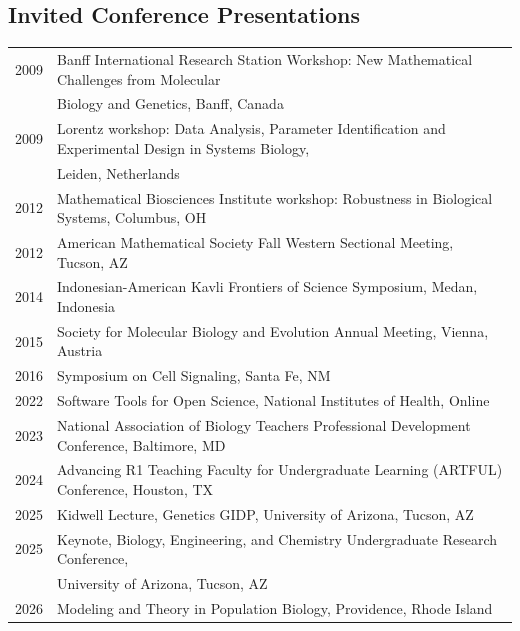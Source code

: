 \documentclass[11pt]{article}
\begin{document}
\subsection*{Invited Conference Presentations}
\begin{longtable}[l]{l l}
2009 & Banff International Research Station Workshop: New Mathematical Challenges from Molecular\\
&Biology and Genetics, Banff, Canada\\
2009 & Lorentz workshop: Data Analysis, Parameter Identification and Experimental Design in Systems Biology,\\& Leiden, Netherlands\\
2012 & Mathematical Biosciences Institute workshop: Robustness in Biological Systems, Columbus, OH\\
2012 & American Mathematical Society Fall Western Sectional Meeting, Tucson, AZ\\
2014 & Indonesian-American Kavli Frontiers of Science Symposium, Medan, Indonesia\\
2015 & Society for Molecular Biology and Evolution Annual Meeting, Vienna, Austria\\
2016 & Symposium on Cell Signaling, Santa Fe, NM\\
2022 & Software Tools for Open Science, National Institutes of Health, Online\\
2023 & National Association of Biology Teachers Professional Development Conference, Baltimore, MD\\
2024 & Advancing R1 Teaching Faculty for Undergraduate Learning (ARTFUL) Conference, Houston, TX\\
2025 & Kidwell Lecture, Genetics GIDP, University of Arizona, Tucson, AZ\\
2025 & Keynote, Biology, Engineering, and Chemistry Undergraduate Research Conference,\\
  & University of Arizona, Tucson, AZ\\
2026 & Modeling and Theory in Population Biology, Providence, Rhode Island\\
\end{longtable}


\end{document}
